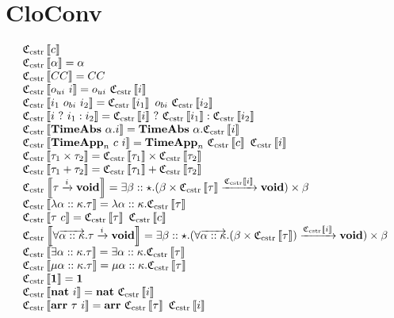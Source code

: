 \documentclass[fleqn]{article}
\begin{document}
\section{CloConv}

\[
\begin{array}{l}
	\cloc{c} \\
	\cloc{\alpha} = \alpha \\
	\cloc{CC} = CC \\
	\cloc{o_{ui}~i} = o_{ui}~\cloc{i} \\
	\cloc{i_1~o_{bi}~i_2} = \cloc{i_1}~o_{bi}~\cloc{i_2} \\
	\cloc{i~?~i_1 : i_2} = \cloc{i}~?~\cloc{i_1} : \cloc{i_2} \\
	\cloc{\mathbf{TimeAbs}~\alpha.i} = \mathbf{TimeAbs}~\alpha.\cloc{i} \\
	\cloc{\mathbf{TimeApp}_n~c~i} = \mathbf{TimeApp}_n~\cloc{c}~\cloc{i} \\
	\cloc{\tau_1 \times \tau_2} = \cloc{\tau_1} \times \cloc{\tau_2} \\
	\cloc{\tau_1 + \tau_2} = \cloc{\tau_1} + \cloc{\tau_2} \\
	\cloc{\tau \xrightarrow{i} \mathbf{void}} = \exists \beta :: \star. (\beta \times \cloc{\tau} \xrightarrow{\cloc{i}} \mathbf{void}) \times \beta \\
	\cloc{\lambda \alpha :: \kappa. \tau} = \lambda \alpha :: \kappa. \cloc{\tau} \\
	\cloc{\tau~c} = \cloc{\tau}~\cloc{c} \\
	\cloc{\forall \overrightarrow{\alpha :: \kappa}. \tau \xrightarrow{i} \mathbf{void}} = \exists \beta :: \star. (\forall \overrightarrow{\alpha :: \kappa}. (\beta \times \cloc{\tau}) \xrightarrow{\cloc{i}} \mathbf{void}) \times \beta \\
	\cloc{\exists \alpha :: \kappa. \tau} = \exists \alpha :: \kappa. \cloc{\tau} \\
	\cloc{\mu \alpha :: \kappa. \tau} = \mu \alpha :: \kappa. \cloc{\tau} \\
	\cloc{\mathbf{1}} = \mathbf{1} \\
	\cloc{\mathbf{nat}~i} = \mathbf{nat}~\cloc{i} \\
	\cloc{\mathbf{arr}~\tau~i} = \mathbf{arr}~\cloc{\tau}~\cloc{i}
\end{array}
\]
\end{document}
